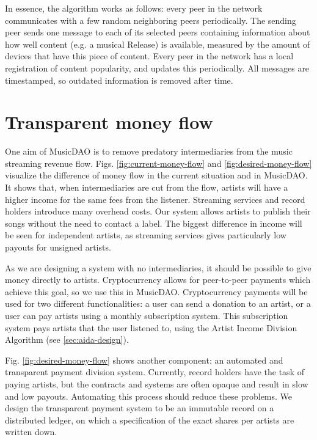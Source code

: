 In essence, the algorithm works as follows: every peer in the network communicates with a few random neighboring peers periodically. The sending peer sends one message to each of its selected peers containing information about how well content (e.g. a musical Release) is available, measured by the amount of devices that have this piece of content. Every peer in the network has a local registration of content popularity, and updates this periodically. All messages are timestamped, so outdated information is removed after time.



\section{Transparent money flow}
One aim of MusicDAO is to remove predatory intermediaries from the music streaming revenue flow. Figs. \ref{fig:current-money-flow} and \ref{fig:desired-money-flow} visualize the difference of money flow in the current situation and in MusicDAO. It shows that, when intermediaries are cut from the flow, artists will have a higher income for the same fees from the listener. Streaming services and record holders introduce many overhead costs. Our system allows artists to publish their songs without the need to contact a label. The biggest difference in income will be seen for independent artists, as streaming services gives particularly low payouts for unsigned artists.

As we are designing a system with no intermediaries, it should be possible to give money directly to artists. Cryptocurrency allows for peer-to-peer payments which achieve this goal, so we use this in MusicDAO. Cryptocurrency payments will be used for two different functionalities: a user can send a donation to an artist, or a user can pay artists using a monthly subscription system. This subscription system pays artists that the user listened to, using the Artist Income Division Algorithm (see \ref{sec:aida-design}). 

Fig. \ref{fig:desired-money-flow} shows another component: an automated and transparent payment division system. Currently, record holders have the task of paying artists, but the contracts and systems are often opaque and result in slow and low payouts. Automating this process should reduce these problems. We design the transparent payment system to be an immutable record on a distributed ledger, on which a specification of the exact shares per artists are written down.

